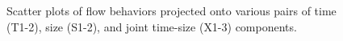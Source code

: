 \documentclass[conference]{IEEEtran}
\newcommand{\caps}[1]{{\small{#1}}}
\begin{document}
\begin{figure}[b]
\begin{center}
\end{center}
\vspace{-0.3em}
\caption{Scatter plots of flow behaviors projected onto various pairs of time (\caps{T1-2}), size (\caps{S1-2}), and joint time-size (\caps{X1-3}) components.}
\label{fig:scatter-plots}
\vspace{-0.2em}
\end{figure}
\end{document}
